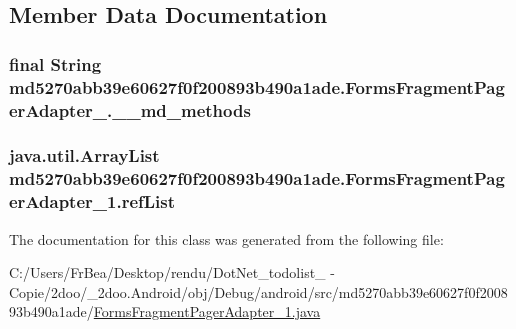 \subsection{Member Data Documentation}
\hypertarget{classmd5270abb39e60627f0f200893b490a1ade_1_1_forms_fragment_pager_adapter__1_8ceb71ce95bf7e4591c10f858ad3dd52}{
\subsubsection[{\_\-\_\-md\_\-methods}]{\setlength{\rightskip}{0pt plus 5cm}final String {\bf md5270abb39e60627f0f200893b490a1ade.FormsFragmentPagerAdapter\_.\_\-\_\-md\_\-methods}}}
\label{classmd5270abb39e60627f0f200893b490a1ade_1_1_forms_fragment_pager_adapter__1_8ceb71ce95bf7e4591c10f858ad3dd52}


\hypertarget{classmd5270abb39e60627f0f200893b490a1ade_1_1_forms_fragment_pager_adapter__1_aa9e57dd2fbab5e679b3261739ea5a57}{
\subsubsection[{refList}]{\setlength{\rightskip}{0pt plus 5cm}java.util.ArrayList {\bf md5270abb39e60627f0f200893b490a1ade.FormsFragmentPagerAdapter\_\-1.refList}}}
\label{classmd5270abb39e60627f0f200893b490a1ade_1_1_forms_fragment_pager_adapter__1_aa9e57dd2fbab5e679b3261739ea5a57}




The documentation for this class was generated from the following file:\begin{CompactItemize}
\item 
C:/Users/FrBea/Desktop/rendu/DotNet\_\-todolist\_ - Copie/2doo/\_\-2doo.Android/obj/Debug/android/src/md5270abb39e60627f0f200893b490a1ade/\hyperlink{_forms_fragment_pager_adapter__1_8java}{FormsFragmentPagerAdapter\_\-1.java}\end{CompactItemize}
